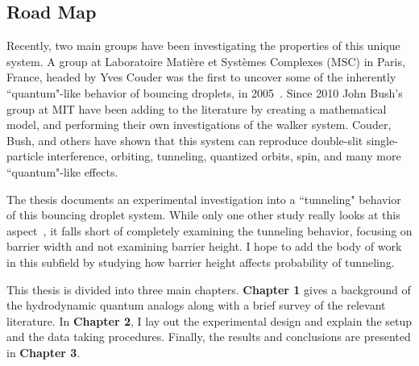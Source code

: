 	  
\subsection{Road Map}	  
	  
	Recently, two main groups have been investigating the properties of this unique system. A group at Laboratoire Mati\`{e}re et Syst\`{e}mes Complexes (MSC) in Paris, France, headed by Yves Couder was the first to uncover some of the inherently ``quantum"-like behavior of bouncing droplets, in 2005~\cite{Couder2005b}. Since 2010 John Bush's group at MIT have been adding to the literature by creating a mathematical model, and performing their own investigations of the walker system. Couder, Bush, and others have shown that this system can reproduce double-slit single-particle interference, orbiting, tunneling, quantized orbits, spin, and many more ``quantum"-like effects. 
		
	The thesis documents an experimental investigation into a ``tunneling" behavior of this bouncing droplet system. While only one other study really looks at this aspect~\cite{tunneling}, it falls short of completely examining the tunneling behavior, focusing on barrier width and not examining barrier height. I hope to add the body of work in this subfield by studying how barrier height affects probability of tunneling.   
	
	This thesis is divided into three main chapters. \textbf{Chapter 1} gives a background of the hydrodynamic quantum analogs along with a brief survey of the relevant literature. In \textbf{Chapter 2}, I lay out the experimental design and explain the setup and the data taking procedures. Finally, the results and conclusions are presented in \textbf{Chapter 3}.	    